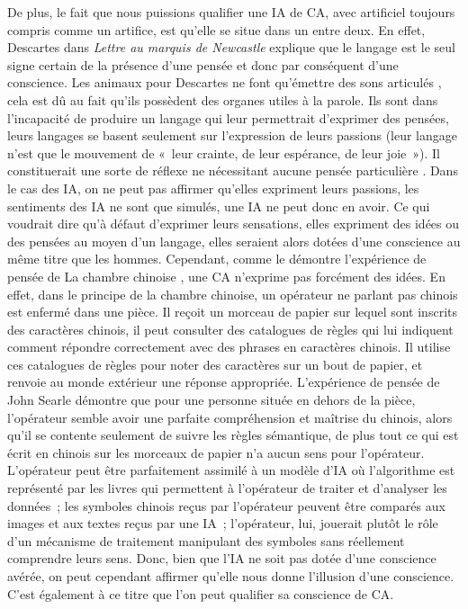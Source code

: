 \documentclass[a4paper, titlepage, 12pt]{article}
\begin{document}
	De plus, le fait que nous puissions qualifier une IA de CA, avec artificiel toujours compris comme un artifice, est qu’elle se situe dans un entre deux. En effet, Descartes dans \textit{Lettre au marquis de Newcastle} explique que le langage est le seul signe certain de la présence d’une pensée et donc par conséquent d’une conscience. Les animaux pour Descartes ne font qu’émettre des sons articulés , cela est dû au fait qu’ils possèdent des organes utiles à la parole. Ils sont dans l’incapacité de produire un langage qui leur permettrait d’exprimer des pensées, leurs langages se basent seulement sur l’expression de leurs passions (leur langage n’est que le mouvement de «~leur crainte, de leur espérance, de leur joie~»). Il constituerait une sorte de réflexe ne nécessitant aucune pensée particulière \cite{descartesOEuvresLettres1937}. Dans le cas des IA, on ne peut pas affirmer qu’elles expriment leurs passions, les sentiments des IA ne sont que simulés, une IA ne peut donc en avoir. Ce qui voudrait dire qu’à défaut d’exprimer leurs sensations, elles expriment des idées ou des pensées au moyen d’un langage, elles seraient alors dotées d’une conscience au même titre que les hommes. Cependant, comme le démontre l’expérience de pensée de La chambre chinoise , une CA n’exprime pas forcément des idées. En effet, dans le principe de la chambre chinoise, un opérateur ne parlant pas chinois est enfermé dans une pièce. Il reçoit un morceau de papier sur lequel sont inscrits des caractères chinois, il peut consulter des catalogues de règles qui lui indiquent comment répondre correctement avec des phrases en caractères chinois. Il utilise ces catalogues de règles pour noter des caractères sur un bout de papier, et renvoie au monde extérieur une réponse appropriée. L’expérience de pensée de John Searle démontre que pour une personne située en dehors de la pièce, l’opérateur semble avoir une parfaite compréhension et maîtrise du chinois, alors qu’il se contente seulement de suivre les règles sémantique, de plus tout ce qui est écrit en chinois sur les morceaux de papier n’a aucun sens pour l’opérateur. L’opérateur peut être parfaitement assimilé à un modèle d’IA où l’algorithme est représenté par les livres qui permettent à l’opérateur de traiter et d’analyser les données~; les symboles chinois reçus par l’opérateur peuvent être comparés aux images et aux textes reçus par une IA~; l’opérateur, lui, jouerait plutôt le rôle d’un mécanisme de traitement manipulant des symboles sans réellement comprendre leurs sens. Donc, bien que l’IA ne soit pas dotée d’une conscience avérée, on peut cependant affirmer qu’elle nous donne l’illusion d’une conscience. C’est également à ce titre que l’on peut qualifier sa conscience de CA.
\end{document}
